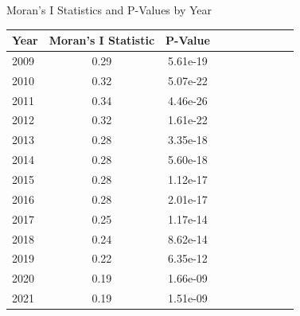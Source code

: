 \documentclass[10pt]{beamer}
\begin{document}
\begin{frame}{Moran's I Statistics and P-Values by Year}
\begin{table}[ht]
\centering
\begin{tabular}{@{}lccccccccc@{}}
\toprule
Year & {Moran's I Statistic} & {P-Value} \\
\midrule
2009 & 0.29 & 5.61e-19 \\
2010 & 0.32 & 5.07e-22 \\
2011 & 0.34 & 4.46e-26 \\
2012 & 0.32 & 1.61e-22 \\
2013 & 0.28 & 3.35e-18 \\
2014 & 0.28 & 5.60e-18 \\
2015 & 0.28 & 1.12e-17 \\
2016 & 0.28 & 2.01e-17 \\
2017 & 0.25 & 1.17e-14 \\
2018 & 0.24 & 8.62e-14 \\
2019 & 0.22 & 6.35e-12 \\
2020 & 0.19 & 1.66e-09 \\
2021 & 0.19 & 1.51e-09 \\
\bottomrule
\end{tabular}
\end{table}
\end{frame}
\end{document}
